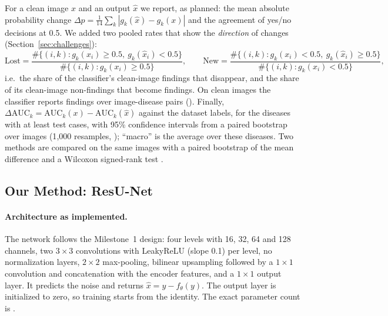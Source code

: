 \documentclass[11pt]{article}
\begin{document}
For a clean image $x$ and an output $\hat{x}$ we report, as planned: the mean absolute probability change $\Delta p=\frac{1}{14}\sum_k |g_k(\hat{x})-g_k(x)|$ and the agreement of yes/no decisions at 0.5. We added two pooled rates that show the \emph{direction} of changes (Section~\ref{sec:challenges}):
\begin{equation}
  \text{Lost} = \frac{\#\{(i,k): g_k(x_i)\ge 0.5,\ g_k(\hat{x}_i)<0.5\}}{\#\{(i,k): g_k(x_i)\ge 0.5\}}, \qquad
  \text{New} = \frac{\#\{(i,k): g_k(x_i)< 0.5,\ g_k(\hat{x}_i)\ge0.5\}}{\#\{(i,k): g_k(x_i)<0.5\}},
\end{equation}
i.e.\ the share of the classifier's clean-image findings that disappear, and the share of its clean-image non-findings that become findings. On clean images the classifier reports \JudgeFindings{} findings over \JudgePairs{} image-disease pairs (\JudgeFindingsPct). Finally, $\Delta\mathrm{AUC}_k=\mathrm{AUC}_k(x)-\mathrm{AUC}_k(\hat{x})$ against the dataset labels, for the \NumAUCDiseases{} diseases with at least \MinPos{} test cases, with 95\% confidence intervals from a paired bootstrap over images (1{,}000 resamples, \citealp{efron1993bootstrap}); ``macro'' is the average over these diseases. Two methods are compared on the same images with a paired bootstrap of the mean difference and a Wilcoxon signed-rank test \citep{wilcoxon1945}.

\begin{table}[htbp]
\centering
\small
\caption{Frozen classifier on the clean test images. Diseases with fewer than \MinPos{} cases have unstable AUCs and are not used for $\Delta$AUC.}
\label{tab:judgeauc}

\end{table}

\subsection{Our Method: ResU-Net}
\label{sec:method}
\paragraph{Architecture as implemented.} The network follows the Milestone~1 design: four levels with 16, 32, 64 and 128 channels, two $3\times3$ convolutions with LeakyReLU (slope 0.1) per level, no normalization layers, $2\times2$ max-pooling, bilinear upsampling followed by a $1\times1$ convolution and concatenation with the encoder features, and a $1\times1$ output layer. It predicts the noise and returns $\hat{x}=y-f_\theta(y)$. The output layer is initialized to zero, so training starts from the identity. The exact parameter count is \Params.
\end{document}
